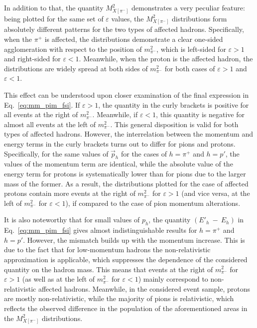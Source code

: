 In addition to that, the quantity $M_{X[\pi^{-}]}^{2}$ demonstrates a very peculiar feature: being plotted for the same set of $\varepsilon$ values, the $M_{X[\pi^{-}]}^{2}$ distributions form absolutely different patterns for the two types of affected hadrons. Specifically, when the $\pi^{+}$ is affected, the distributions demonstrate a clear one-sided agglomeration with respect to the position of $m_{\pi^{-}}^{2}$, which is left-sided for $\varepsilon > 1$ and right-sided for $\varepsilon < 1$. Meanwhile, when the proton is the affected hadron, the distributions are widely spread at both sides of $m_{\pi^{-}}^{2}$ for both cases of $\varepsilon > 1$ and $\varepsilon < 1$. 


This effect can be understood upon closer examination of the final expression in Eq.~\eqref{eq:mm_pim_fsi}. If $\varepsilon > 1$, the quantity in the curly brackets is positive for all events at the right of $m_{\pi^{-}}^{2}$. Meanwhile, if $\varepsilon < 1$, this quantity is negative for almost all events at the left of $m_{\pi^{-}}^{2}$. This general disposition is valid for both types of affected hadrons. However, the interrelation between the momentum and energy terms in the curly brackets turns out to differ for pions and protons. Specifically, for the same values of $\overrightarrow{p}_{\!h}$ for the cases of $h=\pi^{+}$ and $h=p'$, the values of the momentum term are identical, while the absolute value of the energy term for protons is systematically lower than for pions due to the larger mass of the former. As a result, the distributions plotted for the case of affected protons contain more events at the right of $m_{\pi^{-}}^{2}$ for $\varepsilon>1$ (and vice versa, at the left of $m_{\pi^{-}}^{2}$ for $\varepsilon<1$), if compared to the case of pion momentum alterations.


It is also noteworthy that for small values of $p_{h}$, the quantity $(E'_{h}~-~E_{h})$ in Eq.~\eqref{eq:mm_pim_fsi} gives almost indistinguishable results for $h=\pi^{+}$ and $h=p'$. However, the mismatch builds up with the momentum increase. This is due to the fact that for low-momentum hadrons the non-relativistic approximation is applicable, which suppresses the dependence of the considered quantity on the hadron mass. This means that events at the right of $m_{\pi^{-}}^{2}$ for $\varepsilon > 1$ (as well as at the left of $m_{\pi^{-}}^{2}$ for $\varepsilon < 1$) mainly correspond to non-relativistic affected hadrons. Meanwhile, in the considered event sample, protons are mostly non-relativistic, while the majority of pions is relativistic, which reflects the observed difference in the population of the aforementioned areas in the $M_{X[\pi^{-}]}^{2}$ distributions.



